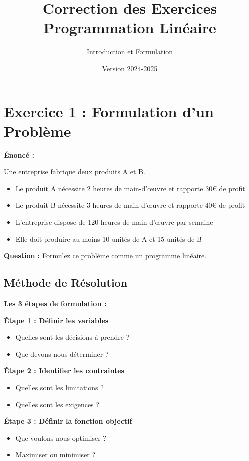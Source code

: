 \documentclass[12pt,a4paper]{article}
\title{\textbf{\Huge\color{titrebleu}Correction des Exercices}\\[0.5em]
\large\color{defvert}Programmation Linéaire}
\author{\large Introduction et Formulation}
\date{\large Version 2024-2025}
\begin{document}
\maketitle
\tableofcontents
\newpage

\section{Exercice 1 : Formulation d'un Problème}

\begin{exercice}
\textbf{Énoncé :}

Une entreprise fabrique deux produits A et B. 
\begin{itemize}
    \item Le produit A nécessite 2 heures de main-d'œuvre et rapporte 30€ de profit
    \item Le produit B nécessite 3 heures de main-d'œuvre et rapporte 40€ de profit
    \item L'entreprise dispose de 120 heures de main-d'œuvre par semaine
    \item Elle doit produire au moins 10 unités de A et 15 unités de B
\end{itemize}

\textbf{Question :} Formulez ce problème comme un programme linéaire.
\end{exercice}

\subsection{Méthode de Résolution}

\begin{methode}
\textbf{Les 3 étapes de formulation :}

\textbf{Étape 1 : Définir les variables}
\begin{itemize}
    \item Quelles sont les décisions à prendre ?
    \item Que devons-nous déterminer ?
\end{itemize}

\textbf{Étape 2 : Identifier les contraintes}
\begin{itemize}
    \item Quelles sont les limitations ?
    \item Quelles sont les exigences ?
\end{itemize}

\textbf{Étape 3 : Définir la fonction objectif}
\begin{itemize}
    \item Que voulons-nous optimiser ?
    \item Maximiser ou minimiser ?
\end{itemize}
\end{methode}
\end{document}
